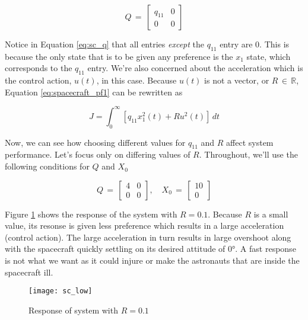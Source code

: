 \begin{equation} \label{eq:sc_q}
    Q \, = \,
    \begin{bmatrix}
        q_{11} & 0 \\
        0      & 0 
    \end{bmatrix}
\end{equation}

Notice in Equation \ref{eq:sc_q} that all entries \textit{except} the $q_{11}$
entry are $0$. This is because the only state that is to be given any 
preference is the $x_1$ state, which corresponds to the $q_{11}$ entry. We're
also concerned about the acceleration which is the control action, $u(t)$, in
this case. Because $u(t)$ is not a vector, or $R \, \in \, \mathbb{R}$, 
Equation \ref{eq:spacecraft_pf1} can be rewritten as

\begin{equation}
    J = \int_{0}^{\infty} [q_{11} x_1^2(t) + R u^2 (t)] \, dt
    \label{eq:spacecraft_pf2}
\end{equation}

Now, we can see how choosing different values for $q_{11}$ and $R$ affect 
system performance. Let's focus only on differing values of $R$. Throughout, 
we'll use the following conditions for $Q$ and $X_0$

\begin{equation} \label{eq:sc_params}
    Q \, = \,
    \begin{bmatrix}
        4 & 0 \\
        0 & 0 
    \end{bmatrix}
    , \quad
    X_0 \, = \,
    \begin{bmatrix}
        10 \\
        0
    \end{bmatrix}
\end{equation}

Figure \ref{fig:sc_low} shows the response of the system with $R = 0.1$. 
Because $R$ is a small value, its resonse is given less preference which 
results in a large acceleration (control action). The large acceleration in
turn results in large overshoot along with the spacecraft quickly settling on 
its desired attitude of $\ang{0}$. A fast response is not what we want as it 
could injure or make the astronauts that are inside the spacecraft ill.

\begin{figure}[H]
    \texttt{[image: sc\_low]}
    \centering
    \caption{Response of system with $R = 0.1$ \cite{kirkdover}}
    \label{fig:sc_low}
\end{figure}

